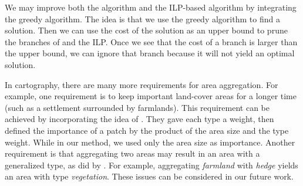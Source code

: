 We may improve both the \Astar algorithm and the ILP-based 
algorithm by integrating the greedy algorithm.
The idea is that we use the greedy algorithm to find 
a solution. 
Then we can use the cost of the solution as an upper bound to 
prune the branches of \Astar and the ILP. 
Once we see that
the cost of a branch is larger than the upper bound,
we can ignore that branch  
because it will not yield an optimal solution.



In cartography, there are many more requirements 
for area aggregation.
For example, one requirement is 
to keep important land-cover areas for a longer time
(such as a settlement surrounded by farmlands).
This requirement can be achieved by incorporating the idea of
\textcite{Dilo2009tGAP}.
They gave each type a weight, 
then defined the importance of a patch 
by the product of the area size and the type weight.
While in our method, we used only the area size as importance.
%
Another requirement is that 
aggregating two areas may result in 
an area with a generalized type,
as did by \textcite{vanSmaalen2003}. 
For example, aggregating 
\emph{farmland} with \emph{hedge} 
yields an area with type \emph{vegetation}.
%
These issues can be considered in our future work.
%






